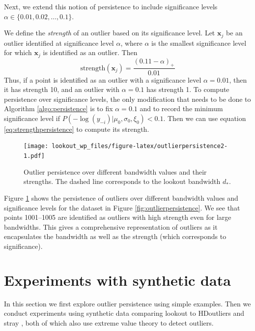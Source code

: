 \documentclass[11pt,a4paper,]{article}
\theoremstyle{definition}
\theoremstyle{definition}
\theoremstyle{definition}
\theoremstyle{remark}
\begin{document}
Next, we extend this notion of persistence to include significance levels \(\alpha \in \{0.01, 0.02, \dots, 0.1 \}\).

We define the \emph{strength} of an outlier based on its significance level. Let \(\bm{x}_j\) be an outlier identified at significance level \(\alpha\), where \(\alpha\) is the smallest significance level for which \(\bm{x}_j\) is identified as an outlier. Then
\begin{equation}\label{eq:strengthpersistence}
    \text{strength} (\bm{x}_j) = \frac{(0.11 - \alpha)_+}{0.01}
\end{equation}
Thus, if a point is identified as an outlier with a significance level \(\alpha = 0.01\), then it has strength 10, and an outlier with \(\alpha = 0.1\) has strength 1. To compute persistence over significance levels, the only modification that needs to be done to Algorithm \ref{algo:persistence} is to fix \(\alpha = 0.1\) and to record the minimum significance level if \(P\left(-\log(y_{-i})|\mu_0, \sigma_0, \xi_0 \right) < 0.1\).
Then we can use equation \eqref{eq:strengthpersistence} to compute its strength.

\begin{figure}
\centering
\texttt{[image: lookout\_wp\_files/figure-latex/outlierpersistence2-1.pdf]}
\caption{\label{fig:outlierpersistence2}Outlier persistence over different bandwidth values and their strengths. The dashed line corresponds to the lookout bandwidth \(d_*\).}
\end{figure}

Figure \ref{fig:outlierpersistence2} shows the persistence of outliers over different bandwidth values and significance levels for the dataset in Figure \ref{fig:outlierpersistence}. We see that points 1001--1005 are identified as outliers with high strength even for large bandwidths. This gives a comprehensive representation of outliers as it encapsulates the bandwidth as well as the strength (which corresponds to significance).

\hypertarget{sec:simulations}{%
\section{Experiments with synthetic data}\label{sec:simulations}}

In this section we first explore outlier persistence using simple examples. Then we conduct experiments using synthetic data comparing lookout to HDoutliers \autocite{wilkinson2017visualizing} and stray \autocite{stray}, both of which also use extreme value theory to detect outliers.
\end{document}

